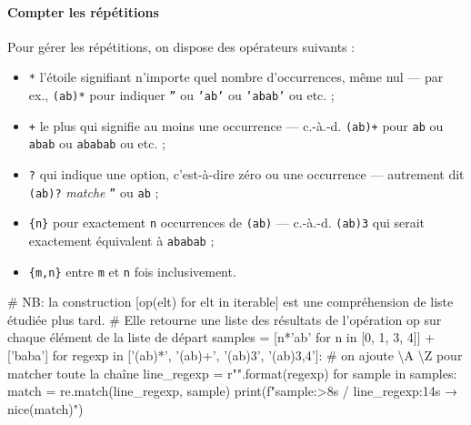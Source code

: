 \paragraph{Compter les répétitions}
Pour gérer les répétitions, on dispose des opérateurs suivants :
\begin{itemize}
\item \texttt{*} l'étoile signifiant n'importe quel nombre d'occurrences, même nul --- par ex., \texttt{(ab)*} pour indiquer \texttt{''} ou \texttt{'ab'} ou \texttt{'abab'} ou etc. ;
\item \texttt{+} le plus qui signifie au moins une occurrence --- c.-à.-d. \texttt{(ab)+} pour \texttt{ab} ou \texttt{abab} ou \texttt{ababab} ou etc. ;
\item \texttt{?} qui indique une option, c'est-à-dire zéro ou une occurrence --- autrement dit \texttt{(ab)?} \textit{matche} \texttt{''} ou \texttt{ab} ;
\item \texttt{\{n\}} pour exactement \texttt{n} occurrences de \texttt{(ab)} --- c.-à.-d. \texttt{(ab){3}} qui serait exactement équivalent à \texttt{ababab} ;
\item \texttt{\{m,n\}} entre \texttt{m} et \texttt{n} fois inclusivement.
\end{itemize}

\begin{idleconsole*}
	\begin{pyconsole}
# NB: la construction [op(elt) for elt in iterable] est une compréhension de liste étudiée plus tard.
# Elle retourne une liste des résultats de l'opération op sur chaque élément de la liste de départ
samples = [n*'ab' for n in [0, 1, 3, 4]] + ['baba']
for regexp in ['(ab)*', '(ab)+', '(ab){3}', '(ab){3,4}']:
    # on ajoute \textbackslash{A} \textbackslash{Z} pour matcher toute la chaîne
    line_regexp = r"\A{}\Z".format(regexp)
    for sample in samples:
        match = re.match(line_regexp, sample)
        print(f"{sample:>8s} / {line_regexp:14s} → {nice(match)}")

\end{pyconsole}
\end{idleconsole*}

\vspace{1pt}

